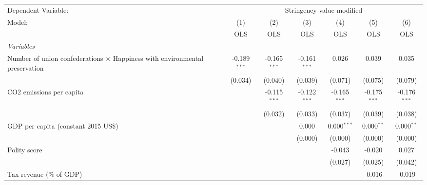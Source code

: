 
\begingroup
\centering
\begin{tabular}{lcccccc}
   \toprule
   Dependent Variable: & \multicolumn{6}{c}{Stringency value modified}\\
   Model:                                                                             & (1)            & (2)            & (3)            & (4)            & (5)            & (6)\\  
                                                                                      &  OLS           & OLS            & OLS            & OLS            & OLS            & OLS\\  
   \midrule
   \emph{Variables}\\
   Number of union confederations $\times$ Happiness with environmental preservation  & -0.189$^{***}$ & -0.165$^{***}$ & -0.161$^{***}$ & 0.026          & 0.039          & 0.035\\   
                                                                                      & (0.034)        & (0.040)        & (0.039)        & (0.071)        & (0.075)        & (0.079)\\   
   CO2 emissions per capita                                                           &                & -0.115$^{***}$ & -0.122$^{***}$ & -0.165$^{***}$ & -0.175$^{***}$ & -0.176$^{***}$\\   
                                                                                      &                & (0.032)        & (0.033)        & (0.037)        & (0.039)        & (0.038)\\   
   GDP per capita (constant 2015 US\$)                                                &                &                & 0.000          & 0.000$^{***}$  & 0.000$^{**}$   & 0.000$^{**}$\\   
                                                                                      &                &                & (0.000)        & (0.000)        & (0.000)        & (0.000)\\   
   Polity score                                                                       &                &                &                & -0.043         & -0.020         & 0.027\\   
                                                                                      &                &                &                & (0.027)        & (0.025)        & (0.042)\\   
   Tax revenue (\% of GDP)                                                            &                &                &                &                & -0.016         & -0.019\\   

\end{tabular}
